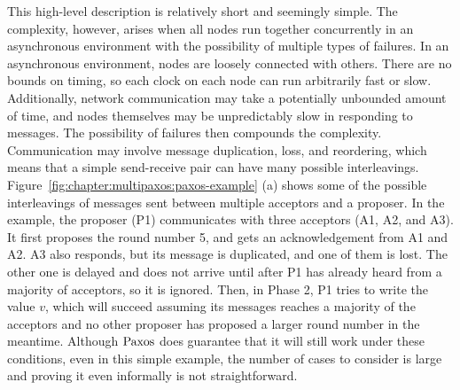 This high-level description is relatively short and seemingly simple.
The complexity, however, arises when all nodes run together concurrently in an asynchronous environment with the possibility of multiple types of failures.
In an asynchronous environment, nodes are loosely connected with others.
There are no bounds on timing, so each clock on each node can run arbitrarily fast or slow.
Additionally, network communication may take a potentially unbounded amount of time,
and nodes themselves may be unpredictably slow in responding to messages.
The possibility of failures then compounds the complexity.
Communication may involve message duplication, loss, and reordering, which means that a simple send-receive pair can have many possible interleavings.
Figure~\ref{fig:chapter:multipaxos:paxos-example} (a) shows some of the possible interleavings of messages sent between multiple acceptors and a proposer.
In the example, the proposer (P1) communicates with three acceptors (A1, A2, and A3).
It first proposes the round number 5, and gets an acknowledgement from A1 and A2.
A3 also responds, but its message is duplicated, and one of them is lost.
The other one is delayed and does not arrive until after P1 has already heard from a majority of acceptors, so it is ignored.
Then, in Phase 2, P1 tries to write the value $v$, which will succeed assuming its messages reaches a majority of the acceptors and no
other proposer has proposed a larger round number in the meantime.
Although $\mathrm{Paxos}$ does guarantee that it will still work under these conditions, even in this simple example,
the number of cases to consider is large and proving it even informally is not straightforward.

